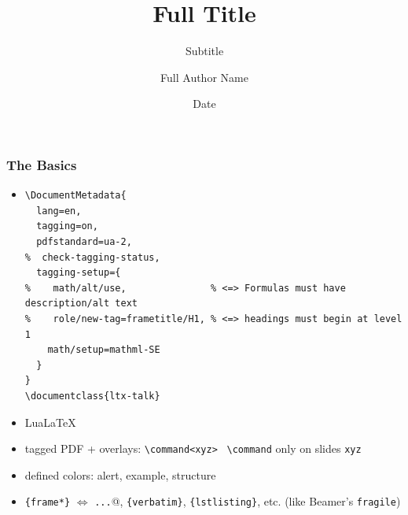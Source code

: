 \documentclass{ltx-talk}
\date{Date}
\title[Short Title]{Full Title}
\subtitle{Subtitle}
\author[Short Author]{Full Author Name}
\institute{University of North Dakota}
\newcommand{\cs}[1]{\texttt{\textbackslash #1}}
\newcommand{\tubbraced}[1]{\texttt{\{#1\}}}
\begin{document}
\begin{frame}
\maketitle[
  element-order = {title, author, titlegraphic, date},
  framestyle = plain,
]
\end{frame}

\begin{frame*}
\frametitle{The Basics}
\begin{itemize}
\item
\begin{verbatim}
\DocumentMetadata{
  lang=en,
  tagging=on,
  pdfstandard=ua-2,
%  check-tagging-status,
  tagging-setup={
%    math/alt/use,               % <=> Formulas must have description/alt text
%    role/new-tag=frametitle/H1, % <=> headings must begin at level 1
    math/setup=mathml-SE
  }
}
\documentclass{ltx-talk}
\end{verbatim}
\item Lua\LaTeX
\item tagged PDF + overlays: \verb|\command<xyz>| \textrightarrow\ \cs{command} only on slides \verb|xyz|
\item defined colors: \textcolor{alert}{alert}, \textcolor{example}{example}, \textcolor{structure}{structure}
\item \tubbraced{frame*} $\Leftrightarrow$ \verb@\verb|...|@,
\tubbraced{verbatim}, \tubbraced{lstlisting}, etc. (like Beamer's \texttt{fragile})
\end{itemize}
\end{frame*}
\end{document}
